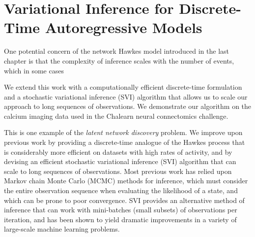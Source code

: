 \chapter{Variational Inference for Discrete-Time Autoregressive Models}
\label{chap:four}


One potential concern  of the network Hawkes model introduced 
in the last chapter is that the complexity of inference scales with the 
number of events, which in some cases 
 
We extend this work with a
computationally efficient discrete-time formulation and a stochastic
variational inference (SVI) algorithm that allows us to scale our
approach to long sequences of observations.  We demonstrate our
algorithm on the calcium imaging data used in the Chalearn neural
connectomics challenge.


This is one example of the \emph{latent network discovery} problem.
We improve upon previous work by providing a discrete-time analogue of
the Hawkes process that is considerably more efficient on datasets
with high rates of activity, and by devising an efficient stochastic
variational inference (SVI) algorithm that can scale to long sequences
of observations.  Most previous work has relied upon Markov chain
Monte Carlo (MCMC) methods for inference, which must consider the
entire observation sequence when evaluating the likelihood of a state,
and which can be prone to poor convergence.  SVI provides an
alternative method of inference that can work with mini-batches (small
subsets) of observations per iteration, and has been shown to yield
dramatic improvements in a variety of large-scale machine learning
problems.

